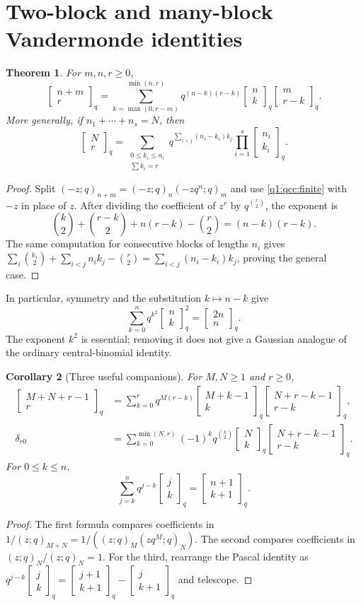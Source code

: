 \documentclass[11pt,a4paper,oneside,openany]{book}
\newtheorem{theorem}{Theorem}[chapter]
\newtheorem{corollary}[theorem]{Corollary}
\theoremstyle{definition}
\theoremstyle{remark}
\newcommand{\GB}[3][q]{\begin{bmatrix}#2\\#3\end{bmatrix}_{#1}}
\newcommand{\qb}[2]{\GB{#1}{#2}}
\newcommand{\poch}[3]{(#1;#2)_{#3}}
\begin{document}
\section{Two-block and many-block Vandermonde identities}
\begin{theorem}\label{q1:qcc:vandermonde}
For \(m,n,r\ge0\),
\begin{equation}\label{q1:qcc:vandermonde-formula}
 \GB{n+m}r=
 \sum_{k=\max(0,r-m)}^{\min(n,r)}
 q^{(n-k)(r-k)}\GB nk\GB m{r-k}.
\end{equation}
More generally, if \(n_1+\cdots+n_s=N\), then
\begin{equation}\label{q1:qcc:block-vandermonde}
 \GB Nr=\sum_{\substack{0\le k_i\le n_i\\\sum k_i=r}}
 q^{\sum_{i<j}(n_i-k_i)k_j}\prod_{i=1}^s\GB{n_i}{k_i}.
\end{equation}
\end{theorem}
\begin{proof}
Split \((-z;q)_{n+m}=(-z;q)_n(-zq^n;q)_m\) and use
\eqref{q1:qcc:finite} with \(-z\) in place of \(z\).
After dividing the coefficient of \(z^r\) by \(q^{\binom r2}\), the exponent is
\[
 \binom k2+\binom{r-k}2+n(r-k)-\binom r2=(n-k)(r-k).
\]
The same computation for consecutive blocks of lengths \(n_i\) gives
\(\sum_i\binom{k_i}2+\sum_{i<j}n_i k_j-\binom r2
 =\sum_{i<j}(n_i-k_i)k_j\), proving the general case.
\end{proof}
In particular, symmetry and the substitution \(k\mapsto n-k\) give
\begin{equation}\label{q1:qcc:central}
 \sum_{k=0}^n q^{k^2}\GB nk^2=\GB{2n}n.
\end{equation}
The exponent \(k^2\) is essential; removing it does not give a Gaussian analogue
of the ordinary central-binomial identity.
\begin{corollary}[Three useful companions]\label{q2:cor:companions}
For $M,N\ge1$ and $r\ge0$,
\begin{align}
 \qb{M+N+r-1}r
 &=\sum_{k=0}^r q^{M(r-k)}\qb{M+k-1}k\qb{N+r-k-1}{r-k},
 \label{q2:eq:negative-vander}\\
 \delta_{r0}
 &=\sum_{k=0}^{\min(N,r)}(-1)^kq^{\binom k2}
     \qb Nk\qb{N+r-k-1}{r-k}.\label{q2:eq:orth-product}
\end{align}
For $0\le k\le n$,
\begin{equation}\label{q2:eq:hockey}
 \sum_{j=k}^n q^{j-k}\qb jk=\qb{n+1}{k+1}.
\end{equation}
\end{corollary}
\begin{proof}
The first formula compares coefficients in
$1/\poch zq{M+N}=1/(\poch zqM\poch{zq^M}qN)$.
The second compares coefficients in
$\poch zqN/\poch zqN=1$.
For the third, rearrange the Pascal identity as
$q^{j-k}\qb jk=\qb{j+1}{k+1}-\qb j{k+1}$ and telescope.
\end{proof}
\end{document}
